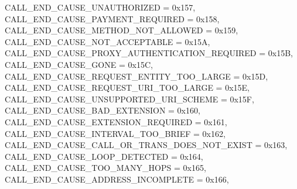 \begin{DoxyItemize}
 C\+A\+L\+L\+\_\+\+E\+N\+D\+\_\+\+C\+A\+U\+S\+E\+\_\+\+U\+N\+A\+U\+T\+H\+O\+R\+I\+Z\+ED = 0x157,~\newline
 C\+A\+L\+L\+\_\+\+E\+N\+D\+\_\+\+C\+A\+U\+S\+E\+\_\+\+P\+A\+Y\+M\+E\+N\+T\+\_\+\+R\+E\+Q\+U\+I\+R\+ED = 0x158,~\newline
 C\+A\+L\+L\+\_\+\+E\+N\+D\+\_\+\+C\+A\+U\+S\+E\+\_\+\+M\+E\+T\+H\+O\+D\+\_\+\+N\+O\+T\+\_\+\+A\+L\+L\+O\+W\+ED = 0x159,~\newline
 C\+A\+L\+L\+\_\+\+E\+N\+D\+\_\+\+C\+A\+U\+S\+E\+\_\+\+N\+O\+T\+\_\+\+A\+C\+C\+E\+P\+T\+A\+B\+LE = 0x15A,~\newline
 C\+A\+L\+L\+\_\+\+E\+N\+D\+\_\+\+C\+A\+U\+S\+E\+\_\+\+P\+R\+O\+X\+Y\+\_\+\+A\+U\+T\+H\+E\+N\+T\+I\+C\+A\+T\+I\+O\+N\+\_\+\+R\+E\+Q\+U\+I\+R\+ED = 0x15B,~\newline
 C\+A\+L\+L\+\_\+\+E\+N\+D\+\_\+\+C\+A\+U\+S\+E\+\_\+\+G\+O\+NE = 0x15C,~\newline
 C\+A\+L\+L\+\_\+\+E\+N\+D\+\_\+\+C\+A\+U\+S\+E\+\_\+\+R\+E\+Q\+U\+E\+S\+T\+\_\+\+E\+N\+T\+I\+T\+Y\+\_\+\+T\+O\+O\+\_\+\+L\+A\+R\+GE = 0x15D,~\newline
 C\+A\+L\+L\+\_\+\+E\+N\+D\+\_\+\+C\+A\+U\+S\+E\+\_\+\+R\+E\+Q\+U\+E\+S\+T\+\_\+\+U\+R\+I\+\_\+\+T\+O\+O\+\_\+\+L\+A\+R\+GE = 0x15E,~\newline
 C\+A\+L\+L\+\_\+\+E\+N\+D\+\_\+\+C\+A\+U\+S\+E\+\_\+\+U\+N\+S\+U\+P\+P\+O\+R\+T\+E\+D\+\_\+\+U\+R\+I\+\_\+\+S\+C\+H\+E\+ME = 0x15F,~\newline
 C\+A\+L\+L\+\_\+\+E\+N\+D\+\_\+\+C\+A\+U\+S\+E\+\_\+\+B\+A\+D\+\_\+\+E\+X\+T\+E\+N\+S\+I\+ON = 0x160,~\newline
 C\+A\+L\+L\+\_\+\+E\+N\+D\+\_\+\+C\+A\+U\+S\+E\+\_\+\+E\+X\+T\+E\+N\+S\+I\+O\+N\+\_\+\+R\+E\+Q\+U\+I\+R\+ED = 0x161,~\newline
 C\+A\+L\+L\+\_\+\+E\+N\+D\+\_\+\+C\+A\+U\+S\+E\+\_\+\+I\+N\+T\+E\+R\+V\+A\+L\+\_\+\+T\+O\+O\+\_\+\+B\+R\+I\+EF = 0x162,~\newline
 C\+A\+L\+L\+\_\+\+E\+N\+D\+\_\+\+C\+A\+U\+S\+E\+\_\+\+C\+A\+L\+L\+\_\+\+O\+R\+\_\+\+T\+R\+A\+N\+S\+\_\+\+D\+O\+E\+S\+\_\+\+N\+O\+T\+\_\+\+E\+X\+I\+ST = 0x163,~\newline
 C\+A\+L\+L\+\_\+\+E\+N\+D\+\_\+\+C\+A\+U\+S\+E\+\_\+\+L\+O\+O\+P\+\_\+\+D\+E\+T\+E\+C\+T\+ED = 0x164,~\newline
 C\+A\+L\+L\+\_\+\+E\+N\+D\+\_\+\+C\+A\+U\+S\+E\+\_\+\+T\+O\+O\+\_\+\+M\+A\+N\+Y\+\_\+\+H\+O\+PS = 0x165,~\newline
 C\+A\+L\+L\+\_\+\+E\+N\+D\+\_\+\+C\+A\+U\+S\+E\+\_\+\+A\+D\+D\+R\+E\+S\+S\+\_\+\+I\+N\+C\+O\+M\+P\+L\+E\+TE = 0x166,~\newline

\end{DoxyItemize}
